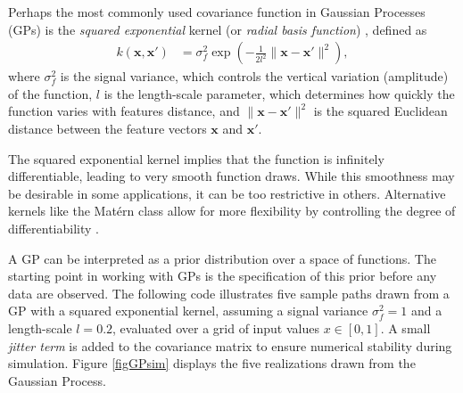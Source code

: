 Perhaps the most commonly used covariance function in Gaussian Processes (GPs) is the \textit{squared exponential} kernel (or \textit{radial basis function}) \cite{jacobi2024posterior}, defined as
\begin{align*}
	k(\mathbf{x}, \mathbf{x}') & = \sigma^2_f \exp\left(-\frac{1}{2l^2} \|\mathbf{x} - \mathbf{x}'\|^2\right),
\end{align*}
where \( \sigma^2_f \) is the signal variance, which controls the vertical variation (amplitude) of the function, \( l \) is the length-scale parameter, which determines how quickly the function varies with features distance, and \( \|\mathbf{x} - \mathbf{x}'\|^2 \) is the squared Euclidean distance between the feature vectors \( \mathbf{x} \) and \( \mathbf{x}' \).

The squared exponential kernel implies that the function is infinitely differentiable, leading to very smooth function draws. While this smoothness may be desirable in some applications, it can be too restrictive in others. Alternative kernels like the Matérn class allow for more flexibility by controlling the degree of differentiability \cite{rasmussen2006gaussian}.

A GP can be interpreted as a prior distribution over a space of functions. The starting point in working with GPs is the specification of this prior before any data are observed. The following code illustrates five sample paths drawn from a GP with a squared exponential kernel, assuming a signal variance \( \sigma_f^2 = 1 \) and a length-scale \( l = 0.2 \), evaluated over a grid of input values \( x \in [0,1] \). A small \textit{jitter term} is added to the covariance matrix to ensure numerical stability during simulation. Figure \ref{figGPsim} displays the five realizations drawn from the Gaussian Process.


